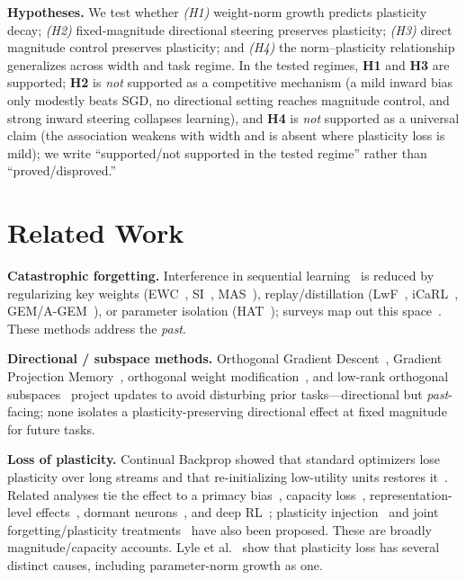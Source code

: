 \documentclass[conference]{IEEEtran}
\begin{document}
\noindent\textbf{Hypotheses.} We test whether \emph{(H1)} weight-norm growth
predicts plasticity decay; \emph{(H2)} fixed-magnitude directional steering
preserves plasticity; \emph{(H3)} direct magnitude control preserves plasticity;
and \emph{(H4)} the norm--plasticity relationship generalizes across width and
task regime. In the tested regimes, \textbf{H1} and \textbf{H3} {are} supported;
\textbf{H2} is \emph{not} supported as a competitive mechanism (a mild inward
bias only modestly beats SGD, no directional setting reaches magnitude control,
and strong inward steering collapses learning), and \textbf{H4} is \emph{not}
supported as a universal claim (the association weakens with width and {is
absent where plasticity loss is mild}); we write {``supported/not supported in
the tested regime'' rather than ``proved/disproved.''}

\section{Related Work}
\textbf{Catastrophic forgetting.} Interference in sequential
learning~\cite{mccloskey1989,goodfellow2013} is reduced by
regularizing key weights (EWC~\cite{kirkpatrick2017}, SI~\cite{zenke2017},
MAS~\cite{aljundi2018mas}), replay/distillation (LwF~\cite{li2017lwf},
iCaRL~\cite{rebuffi2017}, GEM/A-GEM~\cite{lopezpaz2017,chaudhry2019agem}), or
parameter isolation (HAT~\cite{serra2018hat}); surveys map out this
space~\cite{vandeven2019,parisi2019,delange2021}. These methods address the \emph{past}.

\textbf{Directional / subspace methods.} Orthogonal Gradient
Descent~\cite{farajtabar2020}, Gradient Projection Memory~\cite{saha2021gpm},
orthogonal weight modification~\cite{zeng2019owm}, and low-rank orthogonal
subspaces~\cite{chaudhry2020orthog} project updates to avoid disturbing prior
tasks---directional but \emph{past}-facing; none isolates a plasticity-preserving
directional effect at fixed magnitude for future tasks.

\textbf{Loss of plasticity.} Continual Backprop showed that standard optimizers
lose plasticity over long streams and that re-initializing low-utility units
restores it~\cite{dohare2024,dohare2021cbp}. Related analyses tie the effect to a
primacy bias~\cite{nikishin2022}, capacity loss~\cite{lyle2022},
representation-level effects~\cite{lyle2023}, dormant neurons~\cite{sokar2023}, and
deep RL~\cite{abbas2023}; plasticity injection~\cite{nikishin2023} and joint
forgetting/plasticity treatments~\cite{elsayed2024} have also been proposed. These
are broadly magnitude/capacity accounts. Lyle et al.~\cite{lyle2024disentangling}
show that plasticity loss has several distinct causes, including parameter-norm
growth as one.
\end{document}

